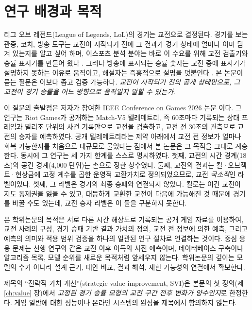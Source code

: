 \section{연구 배경과 목적}
\label{sec:intro-background}

리그 오브 레전드(League of Legends, LoL)의 경기는 교전으로 결정된다. 경기를 보는 관중, 코치, 방송 도구는 교전이 시작되기 전에 그 결과가 경기 상태에 얼마나 이미 담겨 있는지를 알고 싶어 하며, 이스포츠 분석 분야는 바로 이 수요를 위해 교전 검출기와 승률 표시기를 만들어 왔다 \cite{schubert2016encounter,block2018narrative,kokkinakis2020dax,pedrassoli2024passive}. 그러나 방송에 표시되는 승률 숫자는 교전 중에 표시기가 설명하지 못하는 이유로 움직이고, 해설자는 즉흥적으로 설명을 덧붙인다 \cite{pedrassoli2024wincondition}. 본 논문이 묻는 질문은 이보다 좁고 검증 가능하다. \emph{교전이 시작되기 전의 공개 상태만으로, 그 교전이 경기 승률을 어느 방향으로 움직일지 말할 수 있는가.}

이 질문의 출발점은 저자가 참여한 IEEE Conference on Games 2026 논문 \cite{baek2026killconditioned}이다. 그 연구는 Riot Games가 공개하는 Match-V5 텔레메트리, 즉 60초마다 기록되는 상태 프레임과 밀리초 단위의 사건 기록만으로 교전을 검출하고, 교전 전 30초의 관측으로 교전의 승자를 예측하였다. 공개 텔레메트리라는 제약 아래에서 교전 전 정보가 얼마나 회복 가능한지를 처음으로 대규모로 물었다는 점에서 본 논문은 그 목적을 그대로 계승한다. 동시에 그 연구는 세 가지 한계를 스스로 명시하였다. 첫째, 교전의 시간 경계(18초)와 공간 경계(4{,}000 단위)는 손으로 정한 상수였다. 둘째, 교전의 결과는 킬·오브젝트·현상금에 고정 계수를 곱한 운영적 교환가치로 정의되었으므로, 교전 \emph{국소적}인 라벨이었다. 셋째, 그 라벨은 경기의 최종 승패와 연결되지 않았다. 킬로는 이긴 교전이 지도 통제권을 잃을 수 있고, 대등하게 교환한 교전이 다음에 가능해진 것 때문에 경기를 바꿀 수도 있는데, 교전 승자 라벨은 이 둘을 구분하지 못한다.

본 학위논문의 목적은 서로 다른 시간 해상도로 기록되는 공개 게임 자료를 이용하여, 교전 사례의 구성, 경기 승패 기반 결과 가치의 정의, 교전 전 정보에 의한 예측, 그리고 예측의 의미와 적용 범위 검증을 하나의 일관된 연구 절차로 연결하는 것이다. 중심 응용 문제는 선행 연구와 같은 교전 이후 이득의 사전 예측이며, 데이터베이스 구축이나 알고리즘 목록, 모델 순위를 새로운 목적처럼 앞세우지 않는다. 학위논문의 깊이는 모델의 수가 아니라 설계 근거, 대안 비교, 결과 해석, 재현 가능성의 연결에서 확보한다.

제목의 ``전략적 가치 개선''(strategic value improvement, SVI)은 본문의 첫 정의(제 \ref{ch:value} 장)에서 \emph{고정된 경기 승률 모형의 교전 구간 전후 변화가 양수인지}로 한정한다. 게임 일반에 대한 성능이나 온라인 시스템의 완성을 제목에서 함의하지 않는다.
